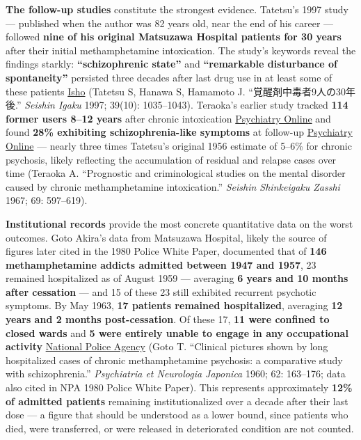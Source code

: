 \textbf{The follow-up studies} constitute the strongest evidence. Tatetsu's 1997 study --- published when the author was 82 years old, near the end of his career --- followed \textbf{nine of his original Matsuzawa Hospital patients for 30 years} after their initial methamphetamine intoxication. The study's keywords reveal the findings starkly: \textbf{``schizophrenic state''} and \textbf{``remarkable disturbance of spontaneity''} persisted three decades after last drug use in at least some of these patients \href{https://webview.isho.jp/journal/detail/abs/10.11477/mf.1405904411}{Isho} (Tatetsu S, Hanawa S, Hamamoto J. ``覚醒剤中毒者9人の30年後.'' \emph{Seishin Igaku} 1997; 39(10): 1035--1043). Teraoka's earlier study tracked \textbf{114 former users 8--12 years} after chronic intoxication \href{https://psychiatryonline.org/doi/pdf/10.1176/appi.ajp.2009.08111695?download=true}{Psychiatry Online} and found \textbf{28\% exhibiting schizophrenia-like symptoms} at follow-up \href{https://psychiatryonline.org/doi/10.1176/appi.ajp.2009.08111695}{Psychiatry Online} --- nearly three times Tatetsu's original 1956 estimate of 5--6\% for chronic psychosis, likely reflecting the accumulation of residual and relapse cases over time (Teraoka A. ``Prognostic and criminological studies on the mental disorder caused by chronic methamphetamine intoxication.'' \emph{Seishin Shinkeigaku Zasshi} 1967; 69: 597--619).

\textbf{Institutional records} provide the most concrete quantitative data on the worst outcomes. Goto Akira's data from Matsuzawa Hospital, likely the source of figures later cited in the 1980 Police White Paper, documented that of \textbf{146 methamphetamine addicts admitted between 1947 and 1957}, 23 remained hospitalized as of August 1959 --- averaging \textbf{6 years and 10 months after cessation} --- and 15 of these 23 still exhibited recurrent psychotic symptoms. By May 1963, \textbf{17 patients remained hospitalized}, averaging \textbf{12 years and 2 months post-cessation}. Of these 17, \textbf{11 were confined to closed wards} and \textbf{5 were entirely unable to engage in any occupational activity} \href{https://www.npa.go.jp/hakusyo/s55/s550200.html}{National Police Agency} (Goto T. ``Clinical pictures shown by long hospitalized cases of chronic methamphetamine psychosis: a comparative study with schizophrenia.'' \emph{Psychiatria et Neurologia Japonica} 1960; 62: 163--176; data also cited in NPA 1980 Police White Paper). This represents approximately \textbf{12\% of admitted patients} remaining institutionalized over a decade after their last dose --- a figure that should be understood as a lower bound, since patients who died, were transferred, or were released in deteriorated condition are not counted.

